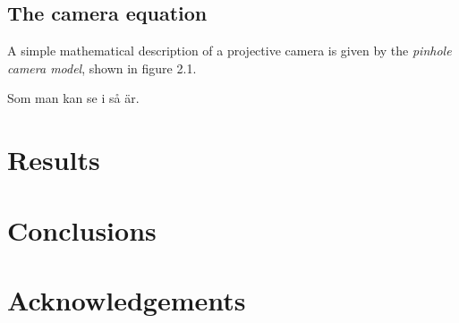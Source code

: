 \documentclass[a4paper]{article}
\begin{document}
\subsection{The camera equation}
A simple mathematical description of a projective camera is given
by the \emph{pinhole camera model}, shown in figure 2.1.


Som man kan se i \cite{alvarez-guichard-etal-crasp-92} så är.


\section{Results}

\section{Conclusions}

\section*{Acknowledgements}



\end{document}
